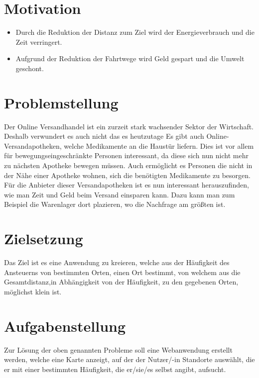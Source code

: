 \documentclass[a4paper, twoside, 12pt]{scrreprt}
\begin{document}
\section{Motivation}
\begin{itemize}
\item Durch die Reduktion der Distanz zum Ziel wird der Energieverbrauch und die Zeit verringert.
\item Aufgrund der Reduktion der Fahrtwege wird Geld gespart und die Umwelt geschont.
\end{itemize}
\section{Problemstellung}
Der Online Versandhandel ist ein zurzeit stark wachsender Sektor der Wirtschaft.\cite{Stepper2016}
Deshalb verwundert es auch nicht das es heutzutage
Es gibt auch Online-Versandapotheken, welche Medikamente an die Haustür liefern.
Dies ist vor allem für bewegungseingeschränkte Personen interessant, da diese sich nun nicht mehr zu nächsten Apotheke bewegen müssen.
Auch ermöglicht es Personen die nicht in der Nähe einer Apotheke wohnen, sich die benötigten Medikamente zu besorgen.
Für die Anbieter dieser Versandapotheken ist es nun interessant herauszufinden, wie man Zeit und Geld beim Versand einsparen kann.
Dazu kann man zum Beispiel die Warenlager dort plazieren, wo die Nachfrage am größten ist.
\section{Zielsetzung}
Das Ziel ist es eine Anwendung zu kreieren, welche aus der Häufigkeit des Ansteuerns von bestimmten Orten, einen Ort bestimmt, von welchem aus die Gesamtdistanz,in Abhängigkeit von der Häufigkeit, zu den gegebenen Orten, möglichst klein ist.
\section{Aufgabenstellung}
Zur Lösung der oben genannten Probleme soll eine Webanwendung erstellt werden, welche eine Karte anzeigt, auf der der Nutzer/-in Standorte auswählt, die er mit einer bestimmten Häufigkeit, die er/sie/es selbst angibt, aufsucht.
\end{document}
